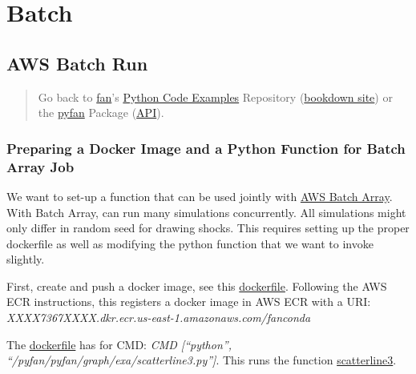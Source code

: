 \documentclass[
]{book}
\begin{document}
\hypertarget{batch}{%
\section{Batch}\label{batch}}

\hypertarget{aws-batch-run}{%
\subsection{AWS Batch Run}\label{aws-batch-run}}

\begin{quote}
Go back to \href{http://fanwangecon.github.io/}{fan}'s \href{https://fanwangecon.github.io/Py4Econ/}{Python Code Examples} Repository (\href{https://fanwangecon.github.io/Py4Econ/bookdown}{bookdown site}) or the \href{https://pyfan.readthedocs.io/en/latest/}{pyfan} Package (\href{https://pyfan.readthedocs.io/en/latest/reference.html}{API}).
\end{quote}

\hypertarget{preparing-a-docker-image-and-a-python-function-for-batch-array-job}{%
\subsubsection{Preparing a Docker Image and a Python Function for Batch Array Job}\label{preparing-a-docker-image-and-a-python-function-for-batch-array-job}}

We want to set-up a function that can be used jointly with \href{https://docs.aws.amazon.com/batch/latest/userguide/array_jobs.html}{AWS Batch Array}. With Batch Array, can run many simulations concurrently. All simulations might only differ in random seed for drawing shocks. This requires setting up the proper dockerfile as well as modifying the python function that we want to invoke slightly.

First, create and push a docker image, see this \href{https://fanwangecon.github.io/Py4Econ/docker/setup/htmlpdfr/fs_docker_ecr.html\#141_Example_Docker_File_for_AWS}{dockerfile}. Following the AWS ECR instructions, this registers a docker image in AWS ECR with a URI: \emph{XXXX7367XXXX.dkr.ecr.us-east-1.amazonaws.com/fanconda}

The \href{https://fanwangecon.github.io/Py4Econ/docker/setup/htmlpdfr/fs_docker_ecr.html\#141_Example_Docker_File_for_AWS}{dockerfile} has for CMD: \emph{CMD {[}``python'', ``/pyfan/pyfan/graph/exa/scatterline3.py''{]}}. This runs the function \href{https://github.com/FanWangEcon/pyfan/blob/master/pyfan/graph/exa/scatterline3.py}{scatterline3}.
\end{document}
